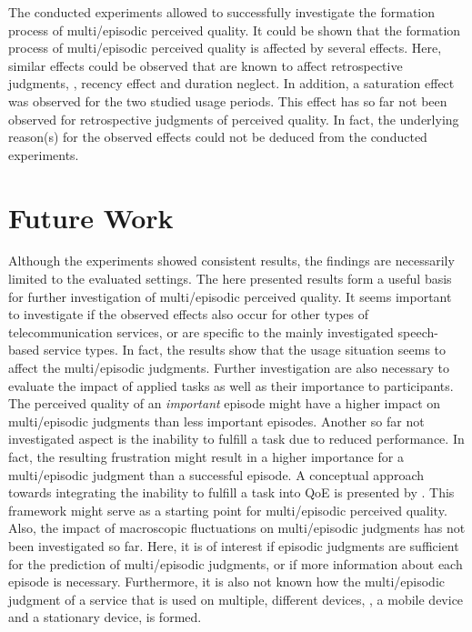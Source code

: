 The conducted experiments allowed to successfully investigate the formation process of multi\-/episodic perceived quality.
It could be shown that the formation process of multi\-/episodic perceived quality is affected by several effects.
Here, similar effects could be observed that are known to affect retrospective judgments, \ie, recency effect and duration neglect.
In addition, a saturation effect was observed for the two studied usage periods.
This effect has so far not been observed for retrospective judgments of perceived quality.
In fact, the underlying reason(s) for the observed effects could not be deduced from the conducted experiments.

\section{Future Work}
Although the experiments showed consistent results, the findings are necessarily limited to the evaluated settings.
The here presented results form a useful basis for further investigation of multi\-/episodic perceived quality.
It seems important to investigate if the observed effects also occur for other types of telecommunication services, or are specific to the mainly investigated speech-based service types.
In fact, the results show that the usage situation seems to affect the multi\-/episodic judgments.
Further investigation are also necessary to evaluate the impact of applied tasks as well as their importance to participants.
The perceived quality of an \emph{important} episode might have a higher impact on multi\-/episodic judgments than less important episodes.
Another so far not investigated aspect is the inability to fulfill a task due to reduced performance.
In fact, the resulting frustration might result in a higher importance for a multi\-/episodic judgment than a successful episode.
A conceptual approach towards integrating the inability to fulfill a task into \ac{QoE} is presented by \citet{leon-garcia_generalizing_2014}.
This framework might serve as a starting point for multi\-/episodic perceived quality.
Also, the impact of macroscopic fluctuations on multi\-/episodic judgments has not been investigated so far.
Here, it is of interest if episodic judgments are sufficient for the prediction of multi\-/episodic judgments, or if more information about each episode is necessary.
Furthermore, it is also not known how the multi\-/episodic judgment of a service that is used on multiple, different devices, \eg, a mobile device and a stationary device, is formed.
